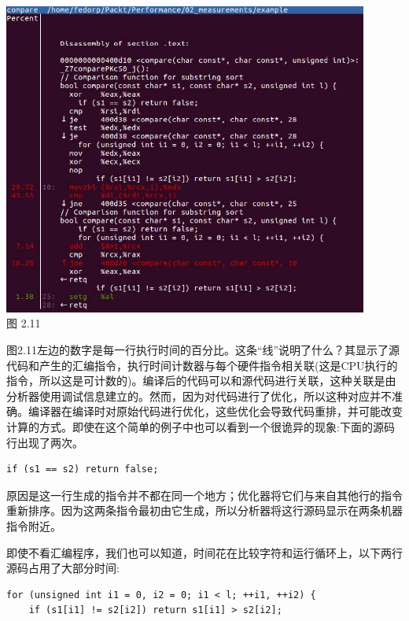 \begin{center}
\includegraphics[width=0.9\textwidth]{content/1/chapter2/images/11.jpg}\\
图 2.11
\end{center}

图2.11左边的数字是每一行执行时间的百分比。这条“线”说明了什么？其显示了源代码和产生的汇编指令，执行时间计数器与每个硬件指令相关联(这是CPU执行的指令，所以这是可计数的)。编译后的代码可以和源代码进行关联，这种关联是由分析器使用调试信息建立的。然而，因为对代码进行了优化，所以这种对应并不准确。编译器在编译时对原始代码进行优化，这些优化会导致代码重排，并可能改变计算的方式。即使在这个简单的例子中也可以看到一个很诡异的现象:下面的源码行出现了两次。

\begin{lstlisting}[style=styleCXX]
if (s1 == s2) return false;
\end{lstlisting}

原因是这一行生成的指令并不都在同一个地方；优化器将它们与来自其他行的指令重新排序。因为这两条指令最初由它生成，所以分析器将这行源码显示在两条机器指令附近。

即使不看汇编程序，我们也可以知道，时间花在比较字符和运行循环上，以下两行源码占用了大部分时间:

\begin{lstlisting}[style=styleCXX]
for (unsigned int i1 = 0, i2 = 0; i1 < l; ++i1, ++i2) {
	if (s1[i1] != s2[i2]) return s1[i1] > s2[i2];
\end{lstlisting}


